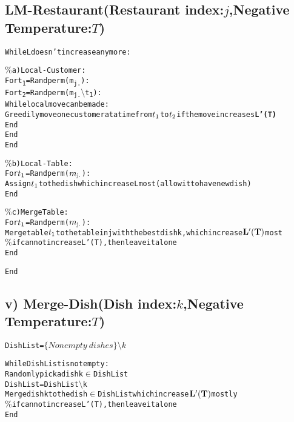 \documentclass{article}
\begin{document}
\subsection{LM-Restaurant(Restaurant index:$j$,Negative Temperature:$T$)}
\begin{alltt}
While L doesn't increase any more:
     
     \(\%\)a)Local-Customer:
        For t\textsubscript{1}=Randperm(m\textsubscript{j.}):
             For t\textsubscript{2}=Randperm(m\textsubscript{j.}\(\setminus\) t\textsubscript{1}):
                While local move can be made:
                      Greedily move one customer at a time from \(t\textsubscript{1}\) to \(t\textsubscript{2}\) if the move increases {\bf L'(T)} 
                End
             End
        End
     
      \(\%\)b)Local-Table:
        For \(t\textsubscript{1}\)=Randperm(\(m\textsubscript{j.}\)):
            Assign \(t\textsubscript{1}\) to the dish which increase L most(allow it to have new dish)
        End
              
      \(\%\)c)Merge Table:
        For \(t\textsubscript{1}\)=Randperm(\(m\textsubscript{j.}\)):
            Merge table \(t\textsubscript{1}\) to the table in j with the best dish k, which increase \({\bf L'(T)}\) most
            \(\%\)if cannot increase L'(T),then leave it alone
        End

End
\end{alltt}
\subsection{v) Merge-Dish(Dish index:$k$,Negative Temperature:$T$)}
\begin{alltt}
Dish List=\(\{Nonempty \ dishes\}\setminus k\)
 
While Dish List is not empty:
    Randomly pick a dish k\(\in\) Dish List
    Dish List=Dish List\(\setminus\)k
    Merge dish k to the dish\(\in\) Dish List which increase \({\bf L'(T)}\) mostly
    \(\%\)if cannot increase L'(T), then leave it alone
End
 
\end{alltt}
\end{document}

